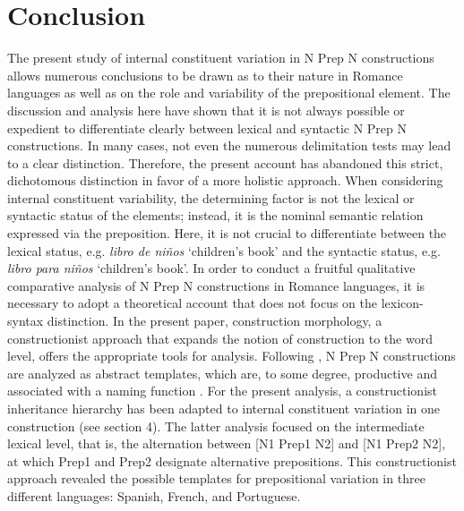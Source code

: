 \documentclass[output=paper]{langsci/langscibook}
\begin{document}
\section{Conclusion}

The present study of internal constituent variation in N Prep N constructions allows numerous conclusions to be drawn as to their nature in Romance languages as well as on the role and variability of the prepositional element. The discussion and analysis here have shown that it is not always possible or expedient to differentiate clearly between lexical and syntactic N Prep N constructions. In many cases, not even the numerous delimitation tests may lead to a clear distinction. Therefore, the present account has abandoned this strict, dichotomous distinction in favor of a more holistic approach. When considering internal constituent variability, the determining factor is not the lexical or syntactic status of the elements; instead, it is the nominal semantic relation expressed via the preposition. Here, it is not crucial to differentiate between the lexical status, e.g. \textit{libro de niños }`children’s book' and the syntactic status, e.g. \textit{libro para niños} `children’s book'. In order to conduct a fruitful qualitative comparative analysis of N Prep N constructions in Romance languages, it is necessary to adopt a theoretical account that does not focus on the lexicon-syntax distinction. In the present paper, construction morphology, a constructionist approach that expands the notion of construction to the word level, offers the appropriate tools for analysis. Following \citet{Masini:2009}, N Prep N constructions are analyzed as abstract templates, which are, to some degree, productive and associated with a naming function  \citep [261]{Masini:2009}. For the present analysis, a constructionist inheritance hierarchy has been adapted to internal constituent variation in one construction (see section 4). The latter analysis focused on the intermediate lexical level, that is, the alternation between [N1 Prep1 N2] and [N1 Prep2 N2], at which Prep1 and Prep2 designate alternative prepositions. This constructionist approach revealed the possible templates for prepositional variation in three different languages: Spanish, French, and Portuguese. 
\end{document}
